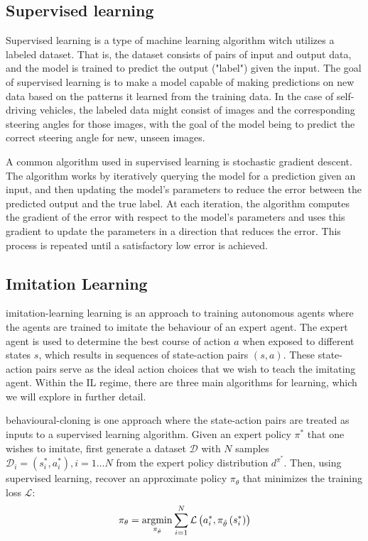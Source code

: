 \subsection{Supervised learning}
\label{sec:supervised-learning}
Supervised learning is a type of machine learning algorithm witch utilizes a labeled dataset.
That is, the dataset consists of pairs of input and output data,
and the model is trained to predict the output ("label") given the input.
The goal of supervised learning is to make a model
capable of making predictions on new data
based on the patterns it learned from the training data.
In the case of self-driving vehicles,
the labeled data might consist of images and the corresponding steering angles for those images,
with the goal of the model being to predict the correct steering angle for new,
unseen images.

A common algorithm used in supervised learning is stochastic gradient descent.
The algorithm works by iteratively querying the model for a prediction given an input,
and then updating the model's parameters to reduce the error between the predicted output and the true label.
At each iteration, the algorithm computes the gradient of the error with respect to the model's parameters and uses this gradient to update the parameters in a direction that reduces the error.
This process is repeated until a satisfactory low error is achieved.


\subsection{Imitation Learning}

\acrfull{imitation-learning} learning is an approach to training autonomous agents
where the agents are trained to imitate the behaviour of an expert agent.
The expert agent is used to determine the best course of action $a$ when exposed to different states $s$,
which results in sequences of state-action pairs $(s, a)$.
These state-action pairs serve as the ideal action choices
that we wish to teach the imitating agent.
Within the IL regime,
there are three main algorithms for learning,
which we will explore in further detail.

\acrfull{behavioural-cloning} is one approach where the state-action pairs
are treated as inputs to a supervised learning algorithm.
Given an expert policy $\pi^*$ that one wishes to imitate,
first generate a dataset $\mathcal{D}$
with $N$ samples $\mathcal{D}_i = (s^*_i, a^*_i), i = 1 \dots N$
from the expert policy distribution $d^{\pi^*}$.
Then, using supervised learning,
recover an approximate policy $\pi_\theta$
that minimizes the training loss $\mathcal{L}$:
$$
\pi_\theta =
    \operatorname*{argmin}_{\pi_{\hat{\theta}}}
        \sum_{i=1}^{N}
            \mathcal{L} \left(a_i^*, \pi_{\hat{\theta}} \left(s_i^*\right) \right)
$$

